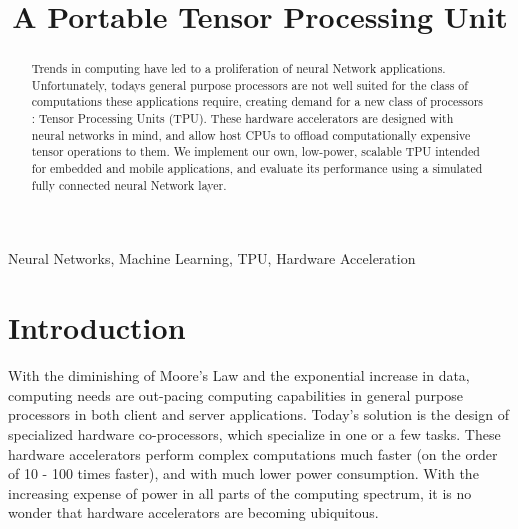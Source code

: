 \documentclass[11pt, conference, onecolumn]{IEEEtran}
\begin{document}
\title{A Portable Tensor Processing Unit\\
}

\author{
\and
{}
\and
{}
\and
{}
}

\maketitle


\begin{abstract}
    Trends in computing have led to a proliferation of neural Network applications.
    Unfortunately, todays general purpose processors are not well suited for the class of
    computations these applications require, creating demand for a new class of processors
    : Tensor Processing Units (TPU). These hardware accelerators are designed with neural
    networks in mind, and allow host CPUs to offload computationally expensive
    tensor operations to them. We implement our own, low-power, scalable TPU intended for
    embedded and mobile applications, and evaluate its performance using a simulated
    fully connected neural Network layer.
\end{abstract}

\begin{IEEEkeywords}
Neural Networks, Machine Learning, TPU, Hardware Acceleration
\end{IEEEkeywords}

\section{Introduction}
    With the diminishing of Moore's Law and the exponential increase in data, computing
    needs are out-pacing computing capabilities in general purpose processors in both
    client and server applications. Today's solution is the design of specialized hardware
    co-processors, which specialize in one or a few tasks. These hardware accelerators
    perform complex computations much faster (on the order of 10 - 100 times faster), and
    with much lower power consumption. With the increasing expense of power in all parts
    of the computing spectrum, it is no wonder that hardware accelerators are becoming
    ubiquitous.
\end{document}
